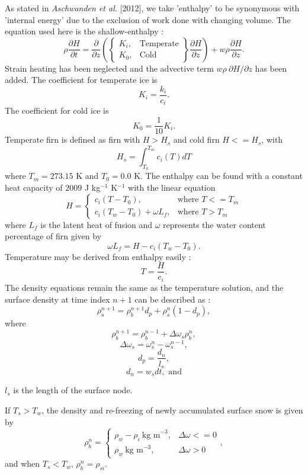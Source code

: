 \documentclass{article}%
\begin{document}
As stated in \emph{Aschwanden et al.} [2012], we take 'enthalpy' to be synonymous with 'internal energy' due to the exclusion of work done with changing volume.  The equation used here is the shallow-enthalpy :
	$$
  \rho \frac{\partial H}{\partial t} = \frac{\partial}{\partial z} 
    \left( 
      \begin{Bmatrix}
        K_i, &\text{Temperate}\\
        K_0, &\text{Cold}
      \end{Bmatrix}
      \frac{\partial H}{\partial z} 
    \right) + w \rho \frac{\partial H}{\partial z}.
  $$
Strain heating has been neglected and the advective term $w \rho\ \partial H / \partial z$ has been added.  The coefficient for temperate ice is 
  $$K_i = \frac{k_i}{c_i}.$$
The coefficient for cold ice is
  $$K_0 = \frac{1}{10}K_i.$$
Temperate firn is defined as firn with $H > H_s$ and cold firn $H <= H_s$, with
  $$H_s = \int_{T_0}^{T_m}{c_i(T)}dT$$ 
where $T_m = 273.15$ K and $T_0 = 0.0$ K.  The enthalpy can be found with a constant heat capacity of $2009$ J kg$^{-1}$ K$^{-1}$ with the linear equation
  $$
  H = 
  \begin{cases}
    c_i(T - T_0), &\text{where } T <= T_m\\
    c_i(T_w - T_0) + \omega L_f,  &\text{where } T > T_m
  \end{cases}
  $$
where $L_f$ is the latent heat of fusion and $\omega$ represents the water content percentage of firn given by
  $$\omega L_f = H - c_i(T_w - T_0).$$
Temperature may be derived from enthalpy easily :
  $$T = \frac{H}{c_i}.$$
The density equations remain the same as the temperature solution, and the surface density at time index $n+1$ can be described as : 
  $$\rho_s^{n+1} = \rho_b^{n+1} d_p + \rho_s^{n} (1 - d_p),$$
where
  $$\rho_b^{n+1} = \rho_b^{n-1} + \Delta \omega_s \rho_b^n,$$
  $$\Delta \omega_s = \omega_s^{n} - \omega_s^{n-1},$$ 
  $$d_p = \frac{d_n}{l_s},$$
  $$d_n = w_sdt,\text{ and}$$
  \begin{center}$l_s$ is the length of the surface node.\end{center}
If $T_s > T_w$, the density and re-freezing of newly accumulated surface snow is given by
  $$
  \rho_b^n = 
  \begin{cases}
    \rho_w - \rho_i\ \text{kg m}^{-3},  &\Delta\omega <= 0\\
    \rho_w\ \text{kg m}^{-3}, &\Delta\omega > 0
  \end{cases},
  $$
and when $T_s < T_w$, $\rho_b^n = \rho_{si}$.
\end{document}
